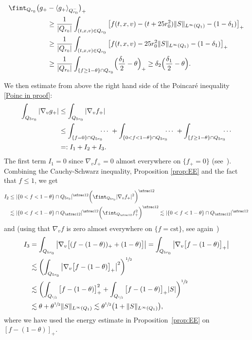 \documentclass[10pt]{amsart}
\theoremstyle{definition}
\theoremstyle{remark}
\begin{document}
\begin{equation}\label{lower bd Poinc}
\begin{aligned}
\fint_{Q_{r_0}} \bigl(g_+&-\langle g_+
\rangle_{Q_{r_0}^{-}}\bigr)_{+} \\
&\ge \frac{1}{|Q_{r_0}|} \int_{(t,x,v) \in Q_{r_0}}
\big[ f(t,x,v) - (t+25r_0^2) \|S\|_{L^\infty(Q_1)}
-(1-\delta_1)\big]_{+}\\
&\ge \frac{1}{|Q_{r_0}|} \int_{(t,x,v) \in Q_{r_0}}
\big[ f(t,x,v) - 25r_0^2 \|S\|_{L^\infty(Q_1)}
-(1-\delta_1)\big]_{+}\\
&\geq \frac{1}{|Q_{r_0}|}
\int_{\{f\geq 1-\theta\}\cap Q_{r_0}}
\Bigl(\frac{\delta_1}{2}-\theta\Bigr)_{+}
\ge \delta_2 \Bigl(\frac{\delta_1}{2}-\theta\Bigr).
\end{aligned}
\end{equation}

We then estimate from above the right hand side of the Poincaré
inequality \eqref{Poinc in proof}:\vspace*{-3pt}
\begin{align*}
\int_{Q_{5r_0}} |\nabla_v g_+| &\le \int_{Q_{5r_0}}
|\nabla_v f_+| \\
&\le \int_{\{ f=0 \} \cap Q_{5r_0}} \hspace*{-2mm}\cdots\
+\int_{\{ 0<f<1-\theta \} \cap Q_{5r_0}} \hspace*{-2mm}\cdots\
+ \int_{\{ f\geq 1-\theta \} \cap Q_{5r_0}} \hspace*{-2mm}\cdots\\
&=: I_1 +I_2 + I_3.
\end{align*}
The first term $I_1=0$ since $\nabla_v f_+ = 0$ almost everywhere
on $\{f_+=0\}$
(see~\cite[\S 4.2.2]{MR3409135}). Combining the
Cauchy-Schwarz inequality, Proposition \ref{prop:EE} and the fact
that $f\leq 1$, we get
\begin{align*}
I_2& \leq |\{0<f<1-\theta\}\cap Q_{5r_0}|^{\sfrac12}\biggl(
\fint_{Q_{5r_0}} |\nabla_v f_+|^2 \biggr)^{\sfrac12} \\
& \lesssim
|\{0<f<1-\theta\}\cap Q_{\sfrac12}|^{\sfrac12}
\biggl(\fint_{Q_{\sfrac12}} f_+^2 \biggr)^{\sfrac12}
\lesssim |\{0<f<1-\theta\}\cap Q_{\sfrac12}|^{\sfrac12}
\end{align*}
and (using that $\nabla_v f$ is zero almost everywhere on
$\{ f = \text{cst} \}$, see
again~\cite[\S 4.2.2]{MR3409135})
\begin{align*}
I_3 &= \int_{Q_{5r_0}} \big|\nabla_v
\big[(f-(1-\theta))_+ +(1-\theta) \big]\big|= \int_{Q_{5r_0}}
\big|\nabla_v \big[f-(1-\theta)\big]_+\big| \\
&\lesssim \biggl( \int_{Q_{5r_0}}
\big|\nabla_v \big[f-(1-\theta)\big]_+\big|^2
\biggr)^{\sfrac12} \\
&\lesssim \biggl( \int_{Q_{\sfrac12}}
\big[f-(1-\theta)\big]_+^2
+ \int_{Q_{\sfrac12}}
\big[f-(1-\theta)\big]_+ |S| \biggr)^{\sfrac12}\\
&\lesssim \theta + \theta^{\sfrac12}\|S\|_{L^\infty(Q_1)}
\lesssim \theta^{\sfrac12}\bigl(1+\|S\|_{L^\infty(Q_1)}\bigr),
\end{align*}
where we have used the energy estimate in
Proposition~\ref{prop:EE} on $[f-(1-\theta)]_+$.
\end{document}
